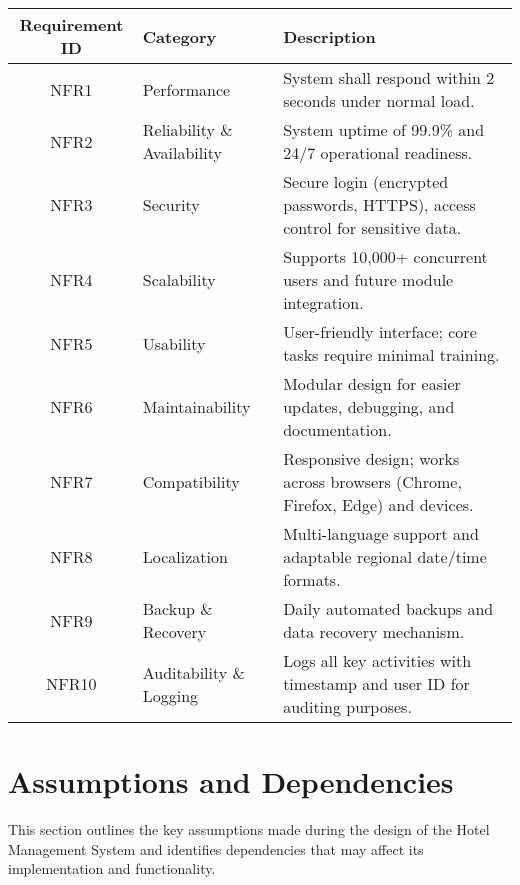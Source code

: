 \documentclass[a4paper,12pt]{article}
\begin{document}
\begin{table}[H]
\centering
\begin{tabular}{|c|l|p{9cm}|}
\hline
\textbf{Requirement ID} & \textbf{Category} & \textbf{Description} \\
\hline
NFR1 & Performance & System shall respond within 2 seconds under normal load. \\
\hline
NFR2 & Reliability \& Availability & System uptime of 99.9\% and 24/7 operational readiness. \\
\hline
NFR3 & Security & Secure login (encrypted passwords, HTTPS), access control for sensitive data. \\
\hline
NFR4 & Scalability & Supports 10,000+ concurrent users and future module integration. \\
\hline
NFR5 & Usability & User-friendly interface; core tasks require minimal training. \\
\hline
NFR6 & Maintainability & Modular design for easier updates, debugging, and documentation. \\
\hline
NFR7 & Compatibility & Responsive design; works across browsers (Chrome, Firefox, Edge) and devices. \\
\hline
NFR8 & Localization & Multi-language support and adaptable regional date/time formats. \\
\hline
NFR9 & Backup \& Recovery & Daily automated backups and data recovery mechanism. \\
\hline
NFR10 & Auditability \& Logging & Logs all key activities with timestamp and user ID for auditing purposes. \\
\hline
\end{tabular}
\end{table}

\section{Assumptions and Dependencies}

This section outlines the key assumptions made during the design of the Hotel Management System and identifies dependencies that may affect its implementation and functionality.
\end{document}
